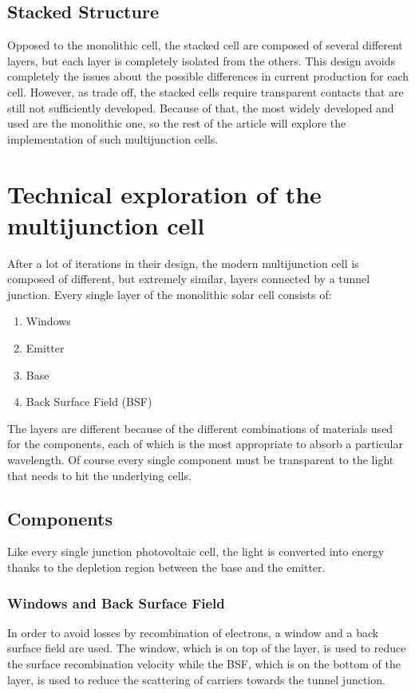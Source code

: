\documentclass[11pt]{article} %
\begin{document}
\subsection{Stacked Structure}

Opposed to the monolithic cell, the stacked cell are composed of several different layers, but each layer is completely isolated from the others.  This design avoids completely the issues about the possible differences in current production for each cell. However, as trade off, the stacked cells require transparent contacts that are still not sufficiently developed.  Because of that, the most widely developed and used are the monolithic one, so the rest of the article will explore the implementation of such multijunction cells.

\section{Technical exploration of the multijunction cell}

After a lot of iterations in their design, the modern multijunction cell is composed of different, but extremely similar, layers connected by a tunnel junction. Every single layer of the monolithic solar cell consists of:  
\begin{enumerate}
	\item Windows 
	\item Emitter 
	\item Base 
	\item Back Surface Field (BSF) 
\end{enumerate}
The layers are different because of the different combinations of materials used for the components, each of which is the most appropriate to absorb a particular wavelength. Of course every single component must be transparent to the light that needs to hit the underlying cells. 

\subsection{Components}  

Like every single junction photovoltaic cell, the light is converted into energy thanks to the depletion region between the base and the emitter.  

\subsubsection{Windows and Back Surface Field}  
In order to avoid losses by recombination of electrons, a window and a back surface field are used.  The window, which is on top of the layer, is used to reduce the surface recombination velocity while the BSF, which is on the bottom of the layer, is used to reduce the scattering of carriers towards the tunnel junction.  
\end{document}
